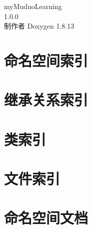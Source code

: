 \documentclass[twoside]{book}
\newcommand{\+}{\discretionary{\mbox{\scriptsize$\hookleftarrow$}}{}{}}
\newcommand{\clearemptydoublepage}{%
  \newpage{\pagestyle{empty}\cleardoublepage}%
}
\begin{document}
\hypersetup{pageanchor=false,
             bookmarksnumbered=true,
             pdfencoding=unicode
            }
\begin{titlepage}
\vspace*{7cm}
\begin{center}%
{\Large my\+Muduo\+Learning \\[1ex]\large 1.\+0.\+0 }\\
\vspace*{1cm}
{\large 制作者 Doxygen 1.8.13}\\
\end{center}
\end{titlepage}
\clearemptydoublepage
{}
\tableofcontents
\clearemptydoublepage
{}
\hypersetup{pageanchor=true}

\chapter{命名空间索引}

\chapter{继承关系索引}

\chapter{类索引}

\chapter{文件索引}

\chapter{命名空间文档}








\end{document}
